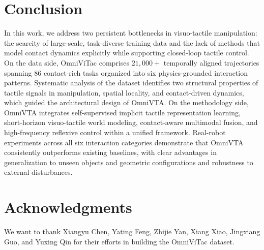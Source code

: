 \section{Conclusion}
In this work, we address two persistent bottlenecks in visuo-tactile manipulation: the scarcity of large-scale, task-diverse training data and the lack of methods that model contact dynamics explicitly while supporting closed-loop tactile control.
On the data side, OmniViTac comprises $21{,}000+$ temporally aligned trajectories spanning $86$ contact-rich tasks organized into six physics-grounded interaction patterns. Systematic analysis of the dataset identifies two structural properties of tactile signals in manipulation, spatial locality, and contact-driven dynamics, which guided the architectural design of OmniVTA.
On the methodology side, OmniVTA integrates self-supervised implicit tactile representation learning, short-horizon visuo-tactile world modeling, contact-aware multimodal fusion, and high-frequency reflexive control within a unified framework. Real-robot experiments across all six interaction categories demonstrate that OmniVTA consistently outperforms existing baselines, with clear advantages in generalization to unseen objects and geometric configurations and robustness to external disturbances.

\section{Acknowledgments}
We want to thank Xiangyu Chen, Yating Feng, Zhijie Yan, Xiang Xiao, Jingxiang Guo, and Yuxing Qin for their efforts in building the OmniViTac dataset.
